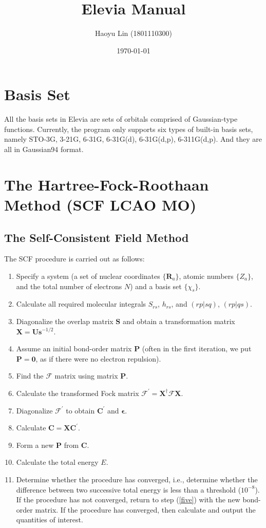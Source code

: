 \documentclass[11pt,a4paper]{article}
\title{Elevia Manual}
\author{Haoyu Lin (1801110300)}
\date{\today}
\begin{document}
	
	\maketitle
	
	\section{Basis Set}
	All the basis sets in Elevia are sets of orbitals comprised of Gaussian-type functions. Currently, the program only supports six types of built-in basis sets, namely STO-3G, 3-21G, 6-31G, 6-31G(d), 6-31G(d,p), 6-311G(d,p). And they are all in Gaussian94 format.
	
	
	\section{The Hartree-Fock-Roothaan Method (SCF LCAO MO)}
	
	\subsection{The Self-Consistent Field Method}
	The SCF procedure is carried out as follows:
	\begin{enumerate}
		\item Specify a system (a set of nuclear coordinates $\{\mathbf{R}_a\}$, atomic numbers $\{Z_a\}$, and the total number of electrons $N$) and a basis set $\{\chi_s\}$. 
		\item Calculate all required molecular integrals $S_{rs}$, $h_{rs}$, and $(rp|sq)$, $(rp|qs)$.
		\item Diagonalize the overlap matrix $\mathbf{S}$ and obtain a transformation matrix $\mathbf{X} = \mathbf{U} \mathbf{s}^{-1/2}$. 
		\item Assume an initial bond-order matrix $\mathbf{P}$ (often in the first iteration, we
		put $\mathbf{P} = \mathbf{0}$, as if there were no electron repulsion).
		\item \label{five} Find the $\boldsymbol{\mathcal{F}}$ matrix using matrix $\mathbf{P}$.
		\item Calculate the transformed Fock matrix $\boldsymbol{\mathcal{F}}^{\prime} = \mathbf{X}^{\dagger} \boldsymbol{\mathcal{F}} \mathbf{X}$.
		\item Diagonalize $\boldsymbol{\mathcal{F}}^{\prime}$ to obtain $\mathbf{C}^{\prime}$ and $\boldsymbol{\epsilon}$. 
		\item Calculate $\mathbf{C} = \mathbf{X} \mathbf{C}^{\prime}$.
		\item Form a new $\mathbf{P}$ from $\mathbf{C}$.
		\item Calculate the total energy $E$.
		\item Determine whether the procedure has converged, i.e., determine whether the difference between two successive total energy is less than a threshold ($10^{-8}$). If the procedure has not converged, return to step (\ref{five}) with the new bond-order matrix. If the procedure has converged, then calculate and output the quantities of interest.
	\end{enumerate}
	
	
	
\end{document}
